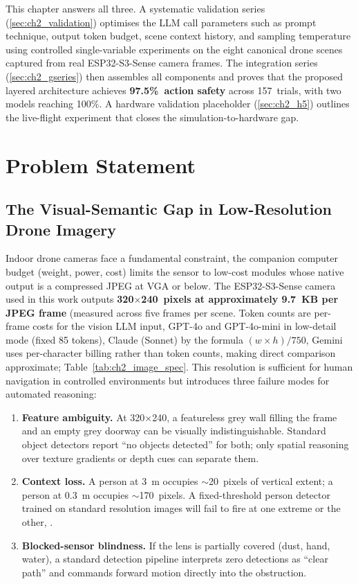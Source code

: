 This chapter answers all three. 
A systematic validation series (\ref{sec:ch2_validation}) optimises the LLM call parameters such as prompt technique, output token budget, scene context history, and sampling temperature using controlled single-variable experiments on the eight canonical drone
scenes captured from real ESP32-S3-Sense camera frames.
The integration series (\ref{sec:ch2_gseries}) then assembles all components and proves that the proposed layered architecture achieves \textbf{97.5\%~action safety} across 157~trials, with two models reaching 100\%. 
A hardware validation placeholder (\ref{sec:ch2_h5}) outlines the
live-flight experiment that closes the simulation-to-hardware gap.


\section{Problem Statement}
\label{sec:ch2_problem}

\subsection{The Visual-Semantic Gap in Low-Resolution Drone Imagery}
\label{sec:ch2_problem_gap}

Indoor drone cameras face a fundamental constraint, the companion computer budget (weight, power, cost) limits the sensor to low-cost modules whose native output is a compressed JPEG at VGA or below. The ESP32-S3-Sense camera used in this work outputs \textbf{320$\times$240~pixels at approximately 9.7~KB per JPEG frame} (measured across five frames per scene.
Token counts are per-frame costs for the vision LLM input, GPT-4o and GPT-4o-mini in low-detail mode (fixed 85 tokens), Claude (Sonnet) by the formula $(w \times h)/750$, Gemini uses per-character billing rather than token counts, making direct comparison approximate; Table~\ref{tab:ch2_image_spec}. 
This resolution is sufficient for human navigation in controlled environments but introduces three failure modes for
automated reasoning:

\begin{enumerate}
  \item \textbf{Feature ambiguity.} At 320$\times$240, a featureless grey wall filling the frame and an empty grey doorway can be visually indistinguishable. 
  Standard object detectors report ``no objects detected'' for both; only spatial reasoning over texture gradients or depth cues can separate them.
  \item \textbf{Context loss.} A person at 3~m occupies $\sim$20~pixels of vertical extent; a person at 0.3~m occupies $\sim$170~pixels. 
  A fixed-threshold person detector trained on standard resolution images will fail to fire at one extreme or the other, \cite{persondetectionuav2025}.
  \item \textbf{Blocked-sensor blindness.} If the lens is partially covered (dust, hand, water), a standard detection pipeline interprets zero detections as ``clear path'' and commands forward motion directly into the obstruction.
\end{enumerate}

